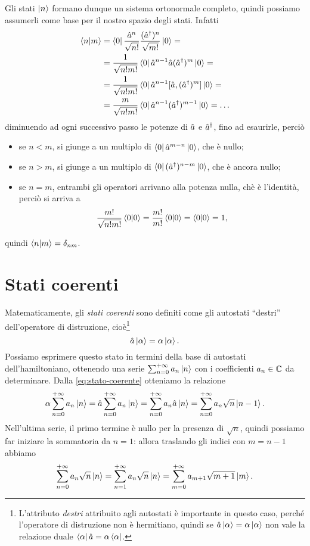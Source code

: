 Gli stati $\left|{n}\right\rangle$ formano dunque un sistema ortonormale completo, quindi possiamo assumerli come base per il nostro spazio degli stati.
Infatti
\begin{equation}
	\begin{split}
		\left\langle{n}\middle|{m}\right\rangle&=\left\langle{0}\right|\frac{\hat{a}^n}{\sqrt{n!}}\frac{({\hat{a}}^\dagger)^n}{\sqrt{m!}}\left|{0}\right\rangle=\\
		&=\frac1{\sqrt{n!m!}}\left\langle{0}\right|\hat{a}^{n-1}\hat{a}({\hat{a}}^\dagger)^m\left|{0}\right\rangle=\\
		&=\frac1{\sqrt{n!m!}}\left\langle{0}\right|\hat{a}^{n-1}[\hat{a},({\hat{a}}^\dagger)^m]\left|{0}\right\rangle=\\
		&=\frac{m}{\sqrt{n!m!}}\left\langle{0}\right|\hat{a}^{n-1}({\hat{a}}^\dagger)^{m-1}\left|{0}\right\rangle=\dots
	\end{split}
	\label{eq:oscillatore-armonico-ortonormalita-autostati}
\end{equation}
diminuendo ad ogni successivo passo le potenze di $\hat{a}$ e ${\hat{a}}^\dagger$, fino ad esaurirle, perciò
\begin{itemize}
	\item se $n<m$, si giunge a un multiplo di $\left\langle{0}\right|\hat{a}^{m-n}\left|{0}\right\rangle$, che è nullo;
	\item se $n>m$, si giunge a un multiplo di $\left\langle{0}\right|({\hat{a}}^\dagger)^{n-m}\left|{0}\right\rangle$, che è ancora nullo;
	\item se $n=m$, entrambi gli operatori arrivano alla potenza nulla, chè è l'identità, perciò si arriva a
		\begin{equation}
			\frac{m!}{\sqrt{n!m!}}\left\langle{0}\middle|{0}\right\rangle=\frac{m!}{m!}\left\langle{0}\middle|{0}\right\rangle=\left\langle{0}\middle|{0}\right\rangle=1,
		\end{equation}
\end{itemize}
quindi $\left\langle{n}\middle|{m}\right\rangle=\delta_{nm}$.

\section{Stati coerenti}
Matematicamente, gli \emph{stati coerenti} sono definiti come gli autostati ``destri'' dell'operatore di distruzione, cioè\footnote{L'attributo \emph{destri} attribuito agli autostati è importante in questo caso, perch\'e l'operatore di distruzione non è hermitiano, quindi se $\hat{a}\left|{\alpha}\right\rangle=\alpha\left|{\alpha}\right\rangle$ non vale la relazione duale $\left\langle{\alpha}\right|\hat{a}=\alpha\left\langle{\alpha}\right|$.}
\begin{equation}
	\hat{a}\left|{\alpha}\right\rangle=\alpha\left|{\alpha}\right\rangle.
	\label{eq:stato-coerente}
\end{equation}
Possiamo esprimere questo stato in termini della base di autostati dell'hamiltoniano, ottenendo una serie $\sum_{{n}=0}^{+\infty}a_n\left|{n}\right\rangle$ con i coefficienti $a_n\in\mathbb{C}$ da determinare.
Dalla \eqref{eq:stato-coerente} otteniamo la relazione
\begin{equation}
	\alpha\sum_{{n}=0}^{+\infty}a_n\left|{n}\right\rangle=\hat{a}\sum_{{n}=0}^{+\infty}a_n\left|{n}\right\rangle=\sum_{{n}=0}^{+\infty}a_n\hat{a}\left|{n}\right\rangle=\sum_{{n}=0}^{+\infty}a_n\sqrt{n}\left|{n-1}\right\rangle.
\end{equation}
Nell'ultima serie, il primo termine è nullo per la presenza di $\sqrt{n}$, quindi possiamo far iniziare la sommatoria da $n=1$: allora traslando gli indici con $m=n-1$ abbiamo
\begin{equation}
	\sum_{{n}=0}^{+\infty}a_n\sqrt{n}\left|{n}\right\rangle=\sum_{{n}=1}^{+\infty}a_n\sqrt{n}\left|{n}\right\rangle=\sum_{{m}=0}^{+\infty}a_{m+1}\sqrt{m+1}\left|{m}\right\rangle.
\end{equation}

